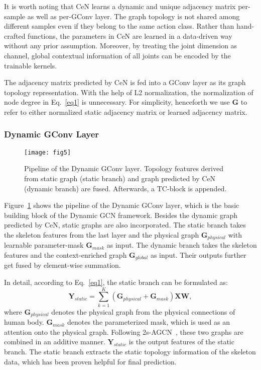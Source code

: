 \documentclass[sigconf]{acmart}
\begin{document}
It is worth noting that CeN learns a dynamic and unique adjacency matrix per-sample as well as per-GConv layer. The graph topology is not shared among different samples even if they belong to the same action class. Rather than hand-crafted functions, the parameters in CeN are learned in a data-driven way without any prior assumption. Moreover, by treating the joint dimension as channel, global contextual information of all joints can be encoded by the trainable kernels.

The adjacency matrix predicted by CeN is fed into a GConv layer as its graph topology representation. With the help of L2 normalization, the normalization of node degree in Eq.~\eqref{eq1} is unnecessary. For simplicity, henceforth we use $\mathbf{G}$ to refer to either normalized static adjacency matrix or learned adjacency matrix.

\subsubsection{Dynamic GConv Layer}
\begin{figure}[t]
\centering
\texttt{[image: fig5]} \caption{Pipeline of the Dynamic GConv layer. Topology features derived from static graph (static branch) and graph predicted by CeN (dynamic branch) are fused. Afterwards, a TC-block is appended.}
\label{fig4}
\end{figure}

Figure~\ref{fig4} shows the pipeline of the Dynamic GConv layer, which is the basic building block of the Dynamic GCN framework. Besides the dynamic graph predicted by CeN, static graphs are also incorporated. The static branch takes the skeleton features from the last layer and the physical graph ${{\mathbf{G}}_{physical}}$ with learnable parameter-mask ${{\mathbf{G}}_{mask}}$ as input. The dynamic branch takes the skeleton features and the context-enriched graph ${{\mathbf{G}}_{global}}$ as input. Their outputs further get fused by element-wise summation.


In detail, according to Eq.~\eqref{eq1}, the static branch can be formulated as:
 \begin{equation}
 {{\mathbf{Y}}_{static}} = \sum\limits_{k = 1}^K {\left( {{{\mathbf{G}}_{physical}} + {{\mathbf{G}}_{mask}}} \right)} {{\mathbf{X}}}{\mathbf{W}},
 \label{eq2}
 \end{equation}
where ${{\mathbf{G}}_{physical}}$ denotes the physical graph from the physical connections of human body. ${{\mathbf{G}}_{mask}}$ denotes the parameterized mask, which is used as an attention onto the physical graph. Following 2s-AGCN~\cite{shi2019two}, these two graphs are combined in an additive manner. ${{\mathbf{Y}}_{static}}$ is the output features of the static branch. The static branch extracts the static topology information of the skeleton data, which has been proven helpful for final prediction.
\end{document}
